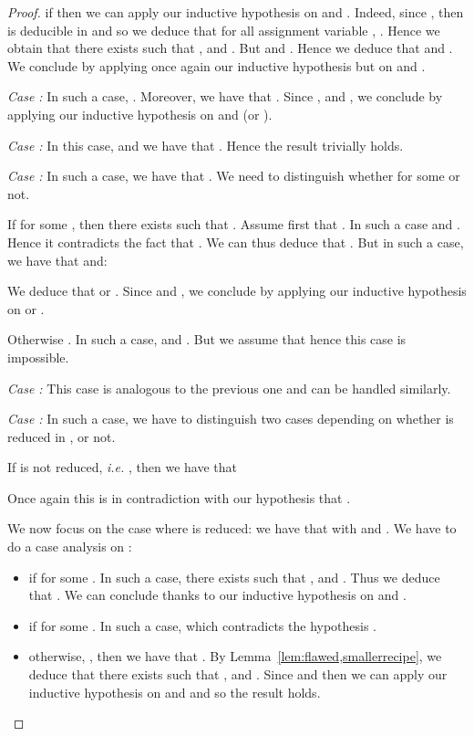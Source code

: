\begin{proof}
 if  then we can apply our inductive hypothesis on  and . Indeed, since , then  is deducible in  and so we deduce that for all assignment variable , . Hence we obtain that there exists  such that ,  and . But  and . Hence we deduce that  and . We conclude by applying once again our inductive hypothesis but on  and .
 
 \smallskip{}

 \emph{Case :} In such a case, . Moreover, we have
 that 
. Since ,  and
 , we
 conclude by applying our inductive hypothesis on  and  (or ).

\smallskip{}

 \emph{Case :} In this case,  and we have
 that . Hence the result trivially holds.

\smallskip{}
 
 \emph{Case :} In such a case, we
 have that
 . We need
 to distinguish whether  for
 some  or not.

 If  for some ,  then there exists  such that . Assume first that . In such a case  and . Hence it contradicts the fact that . We can thus deduce that . But in such a case, we have that  and:

 We deduce that  or . Since  and ,
 we conclude by applying our inductive hypothesis on  or .

 Otherwise . In such a
 case,  and . But we assume that  hence this case is impossible.

\smallskip{}

 \emph{Case :} This case is analogous to the previous one and can
 be handled similarly.


\smallskip{}

 \emph{Case :} In such a case,
 we have to distinguish two cases depending on whether  is reduced in
 , or not.

 If  is not reduced, \emph{i.e.} , then we have that
  
Once again this is in contradiction with our hypothesis that .

We now focus on the case where  is reduced: we have that  with  and . We have to do a case analysis on :
 \begin{itemize}
 \item if  for some . In such a case, there exists  such that ,  and . Thus we deduce that . We can conclude thanks to our inductive hypothesis on  and . 
\item if  for some . In such a case,  which contradicts the hypothesis .
\item otherwise, , then we
have that . By Lemma~\ref{lem:flawed,smallerrecipe}, we deduce that there exists  such that ,  and . Since  and  then we can apply our inductive hypothesis on  and  and so the result holds.
\end{itemize}
\end{proof}



